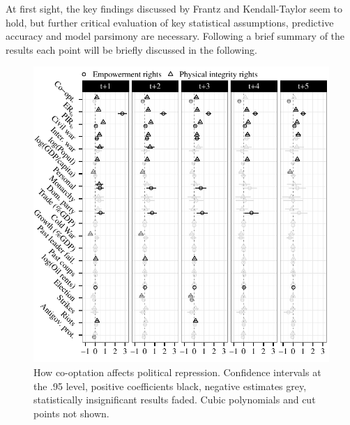 At first sight, the key findings discussed by Frantz and 
Kendall-Taylor seem to hold, but further critical 
evaluation of key statistical assumptions, predictive 
accuracy and model parsimony are necessary. Following a 
brief summary of the results each point will be 
briefly discussed in the following.

\begin{figure}[!ht]
  \centering
  \includegraphics[width=\linewidth]{./sections/03replication/coefPlotOriginal.pdf}
  \caption{How co-optation affects political repression.
    Confidence intervals at the .95 level, positive 
    coefficients black, negative estimates grey, statistically
    insignificant results faded. Cubic polynomials and 
    cut points not shown.%
  }
  \label{fig:coefPlot}
\end{figure}

